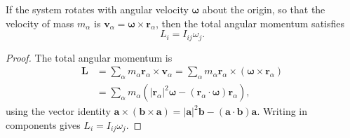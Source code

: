 \documentclass[a4paper]{article}
\begin{document}
\begin{prop}
  If the system rotates with angular velocity $\boldsymbol\omega$ about the origin, so that the velocity of mass $m_\alpha$ is $\mathbf{v}_\alpha = \boldsymbol\omega\times \mathbf{r}_\alpha$, then the total angular momentum satisfies
  \[
    L_i = I_{ij}\omega_j.
  \]
\end{prop}

\begin{proof}
  The total angular momentum is
  \begin{align*}
    \mathbf{L} &= \sum_{\alpha} m_\alpha \mathbf{r}_\alpha \times \mathbf{v}_\alpha = \sum_\alpha m_\alpha \mathbf{r}_\alpha \times (\boldsymbol\omega\times \mathbf{r}_\alpha)\\
    &= \sum_\alpha m_\alpha( |\mathbf{r}_\alpha|^2\boldsymbol\omega - (\mathbf{r}_\alpha \cdot \boldsymbol\omega)\mathbf{r}_\alpha),
  \end{align*}
  using the vector identity $\mathbf{a}\times(\mathbf{b}\times\mathbf{a}) = |\mathbf{a}|^2\mathbf{b} - (\mathbf{a}\cdot\mathbf{b})\mathbf{a}$. Writing in components gives $L_i = I_{ij}\omega_j$.
\end{proof}
\end{document}
